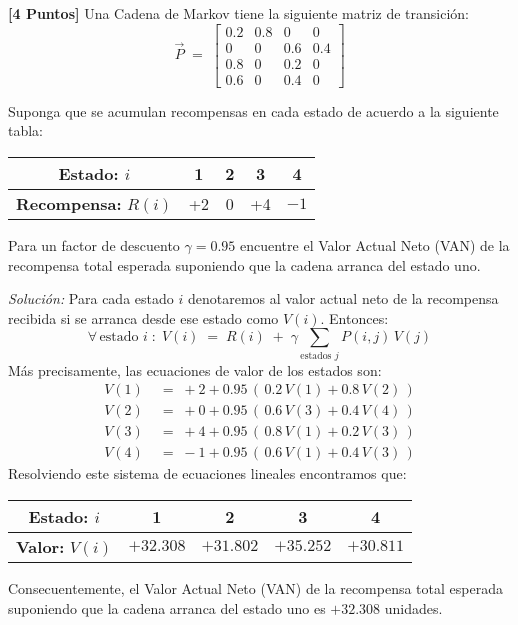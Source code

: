 \documentclass[ a4paper, twoside, 11pt]{article}
\begin{document}
\begin{problem}
\textbf{[4 Puntos]} Una Cadena de Markov tiene la siguiente matriz de transici\'on: 
\[
\vec{P} \; = \; \left[
\begin{array}{cccc}
0.2 & 0.8 & 0 & 0 \\
0 & 0 & 0.6 & 0.4 \\
0.8 & 0 & 0.2 & 0 \\
0.6 & 0 & 0.4 & 0
\end{array} \right]
\]

Suponga que se acumulan recompensas en cada estado de acuerdo a la siguiente tabla: 
\begin{table}[htb]
\centering
\begin{tabular}{|c|c|c|c|c|}
\hline
\textbf{Estado:} $i$ & 1 & 2 & 3 & 4 \\ \hline
\textbf{Recompensa:} $R(i)$ & +2 & 0 & +4 & $-1$ \\ \hline
\end{tabular}
\end{table}

Para un factor de descuento $\gamma = 0.95$ encuentre el Valor Actual Neto (VAN) de la recompensa total esperada suponiendo que la cadena arranca del estado uno. 

\emph{Soluci\'on:} Para cada estado $i$ denotaremos al valor actual neto de la recompensa recibida si se arranca desde ese estado como $V(i)$. Entonces: 
\[
\forall \, \text{estado } i \; \colon \;
V(i) \; = \; R(i)
\; + \; \gamma \sum_{\text{estados } j} P(i,j) \, V(j)
\]
M\'as precisamente, las ecuaciones de valor de los estados son: 
\begin{align*}
V(1) \;
& = \; +2 + 0.95 \, ( \, 0.2 \, V(1) + 0.8 \, V(2) \, ) \\
V(2) \;
& = \; +0 + 0.95 \, ( \, 0.6 \, V(3) + 0.4 \, V(4) \, ) \\
V(3) \;
& = \; +4 + 0.95 \, ( \, 0.8 \, V(1) + 0.2 \, V(3) \, ) \\
V(4) \;
& = \; -1 + 0.95 \, ( \, 0.6 \, V(1) + 0.4 \, V(3) \, )
\end{align*}
Resolviendo este sistema de ecuaciones lineales encontramos que: 
\begin{table}[htb]
\centering
\begin{tabular}{|c|c|c|c|c|}
\hline
\textbf{Estado:} $i$ & 1 & 2 & 3 & 4 \\ \hline
\textbf{Valor:} $V(i)$ & $+32.308$ & $+31.802$ & $+35.252$ & $+30.811$ \\ \hline
\end{tabular}
\end{table}

Consecuentemente, el Valor Actual Neto (VAN) de la recompensa total esperada suponiendo que la cadena arranca del estado uno es $+32.308$ unidades. 

\end{problem}
\vspace{\baselineskip}
\end{document}
